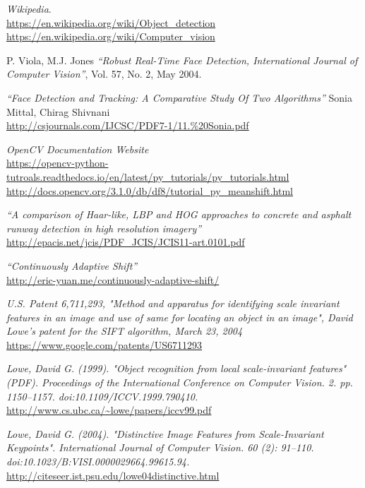 \documentclass[a4paper,12pt]{report}
\begin{document}
\begin{thebibliography}{9}
    \textit{Wikipedia}.\\
    \url{https://en.wikipedia.org/wiki/Object_detection} \\
    \url{https://en.wikipedia.org/wiki/Computer_vision}
    
    P. Viola,  M.J. Jones
    \textit{``Robust  Real-Time  Face  Detection,  International Journal  of  Computer Vision''}, Vol.  57, No. 2, May 2004.
    
    \textit{``Face Detection and Tracking: A Comparative Study Of Two Algorithms''}
    Sonia Mittal, Chirag Shivnani\\
    \url{http://csjournals.com/IJCSC/PDF7-1/11.\%20Sonia.pdf}
    
    \textit{OpenCV Documentation Website} \\
    \url{https://opencv-python-tutroals.readthedocs.io/en/latest/py_tutorials/py_tutorials.html}\\
    \url{http://docs.opencv.org/3.1.0/db/df8/tutorial_py_meanshift.html}
    
    
    \textit{``A comparison of Haar-like, LBP and HOG approaches to concrete and asphalt
runway detection in high resolution imagery''} \\
    \url{http://epacis.net/jcis/PDF_JCIS/JCIS11-art.0101.pdf}
    
    \textit{``Continuously Adaptive Shift''} \\
    \url{http://eric-yuan.me/continuously-adaptive-shift/}
    
    \textit{U.S. Patent 6,711,293, "Method and apparatus for identifying scale invariant features in an image and use of same for locating an object in an image", David Lowe's patent for the SIFT algorithm, March 23, 2004}  \\
    \url{https://www.google.com/patents/US6711293}
    
    \textit{ Lowe, David G. (1999). "Object recognition from local scale-invariant features" (PDF). Proceedings of the International Conference on Computer Vision. 2. pp. 1150–1157. doi:10.1109/ICCV.1999.790410.} \\
    \url{http://www.cs.ubc.ca/~lowe/papers/iccv99.pdf}
    
    \textit{Lowe, David G. (2004). "Distinctive Image Features from Scale-Invariant Keypoints". International Journal of Computer Vision. 60 (2): 91–110. doi:10.1023/B:VISI.0000029664.99615.94.}
    \url{http://citeseer.ist.psu.edu/lowe04distinctive.html}

\end{thebibliography}
\end{document}
